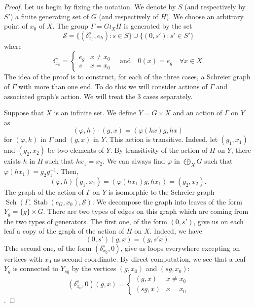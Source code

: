 \documentclass[a4paper]{article}
\theoremstyle{remark}%
\DeclareMathOperator\Sch{Sch}
\DeclareMathOperator\stab{Stab}
\renewcommand*{\phi}{\varphi}
\renewcommand*{\S}{\mathcal{S}}
\begin{document}
\begin{proof}
Let us begin by fixing the notation. We denote by $S$ (and respectively by $S'$) a finite generating set of $G$ (and respectively of $H$). We choose an arbitrary point of $x_0$ of $X$. The group $\Gamma = G \wr_X H $ is generated by the set 
\begin{equation*}
\S = \{(\delta_{x_0}^s, e_h) : s \in S \} \cup \{ (0, s') : s' \in S' \} 
\end{equation*}
where 
\begin{equation*}
\delta_{x_0}^s = \begin{cases} e_g & x \neq x_0 \\ s 	& x = x_0 \end{cases} \quad \text{and}\quad 0(x) = e_g \quad \forall x \in X.
\end{equation*}
The idea of the proof is to construct, for each of the three cases, a Schreier graph of $\Gamma$ with more than one end. To do this we will consider actions of $\Gamma$ and associated graph's action. We will treat the 3 cases separately.

Suppose that $X$ is an infinite set. We define $Y = G \times X$ and an action of $\Gamma$ on $Y$ as
\begin{equation*}
(\phi,h) \cdot (g,x) = (\phi(hx)g, hx)
\end{equation*}
for $(\phi,h)$ in $\Gamma$ and $(g,x)$ in $Y$. This action is transitive. Indeed, let $(g_1,x_1)$ and $(g_2,x_2)$ be two elements of $Y$. By transitivity of the action of $H$ on $Y$, there exists $h$ in $H$ such that $hx_1 = x_2$. We can always find $\phi$ in $\bigoplus_X G$ such that $\phi(hx_1) = g_2g_1^{-1}$. Then, 
\begin{equation*}
(\phi,h) (g_1,x_1) = (\phi(h x_1) g, h x_1) = (g_2,x_2).
\end{equation*}
The graph of the action of $\Gamma$ on $Y$ is isomorphic to the Schreier graph $\Sch(\Gamma, \stab(e_G,x_0), \S)$. We decompose the graph into leaves of the form $Y_g = \{ g \} \times G$. There are two types of edges on this graph which are coming from the two types of generators. The first one, of the form $(0,s')$, give us on each leaf a copy of the graph of the action of $H$ on $X$. Indeed, we have
\begin{equation*}
(0,s')(g,x) = (g, s'x).
\end{equation*}
Tthe second one, of the form $(\delta_{x_0}^s,0)$, give us loops everywhere excepting on vertices with $x_0$ as second coordinate. By direct computation, we see that a leaf $Y_g$ is connected to $Y_{sg}$ by the vertices $(g,x_0)$ and $(sg,x_0)$: 
\begin{equation*}
(\delta_{x_0}^s,0)(g,x) = 
\begin{cases}
(g,x) & x \neq x_0 \\
(sg, x) & x = x_0
\end{cases}
\end{equation*}
.


\end{proof}
\end{document}
